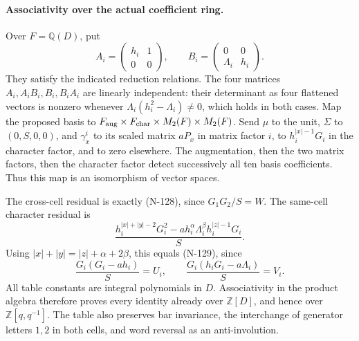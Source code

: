 \paragraph{Associativity over the actual coefficient ring.}
Over $F=\mathbb Q(D)$, put
\[
 A_i=\begin{pmatrix}h_i&1\\0&0\end{pmatrix},\qquad
 B_i=\begin{pmatrix}0&0\\\Lambda_i&h_i\end{pmatrix}.
 \tag{N-130}
\]
They satisfy the indicated reduction relations.  The four matrices
$A_i,A_iB_i,B_i,B_iA_i$ are linearly independent: their determinant
as four flattened vectors is nonzero whenever
$\Lambda_i(h_i^2-\Lambda_i)\ne0$, which holds in both cases.
Map the proposed basis to
$F_{\rm aug}\times F_{\rm char}\times M_2(F)\times M_2(F)$.
Send $\mu$ to the unit, $\Sigma$ to $(0,S,0,0)$, and $\gamma^i_x$
to its scaled matrix $aP_x$ in matrix factor $i$, to
$h_i^{|x|-1}G_i$ in the character factor, and to zero elsewhere.
The augmentation, then the two matrix factors, then the character
factor detect successively all ten basis coefficients.  Thus this
map is an isomorphism of vector spaces.

The cross-cell residual is exactly (N-128), since $G_1G_2/S=W$.
The same-cell character residual is
\[
 \frac{h_i^{|x|+|y|-2}G_i^2
  -a h_i^\alpha\Lambda_i^\beta h_i^{|z|-1}G_i}{S}.
 \tag{N-131}
\]
Using $|x|+|y|=|z|+\alpha+2\beta$, this equals (N-129), since
\[
 \frac{G_i(G_i-ah_i)}S=U_i,\qquad
 \frac{G_i(h_iG_i-a\Lambda_i)}S=V_i.
\]
All table constants are integral polynomials in $D$.
Associativity in the product algebra therefore proves every identity
already over $\mathbb Z[D]$, and hence over $\mathbb Z[q,q^{-1}]$.
The table also preserves bar invariance, the interchange of generator
letters $1,2$ in both cells, and word reversal as an anti-involution.

